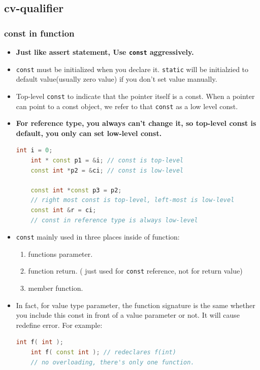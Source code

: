 \documentclass[a4paper,12pt,twoside]{book}
\begin{document}
\subsection{cv-qualifier}
\subsubsection{const in function}
\begin{itemize}
	\item \textbf{Just like assert statement, Use \texttt{const} aggressively.}
	
	\item \texttt{const} must be initialized when you declare it. \texttt{static} will be initialzied to default value(usually zero value) if you don't set value manually. 
	
	\item Top-level \texttt{const} to indicate that the pointer itself is a const. When a pointer can point to a const object, we refer to that \texttt{const} as a low level const.
	
	\item \textbf{For reference type, you always can't change it, so top-level const is default, you only can set low-level const.}
	\begin{lstlisting}[frame=single, language=c++]
	int i = 0;
	int * const p1 = &i; // const is top-level
	const int *p2 = &ci; // const is low-level
	
	const int *const p3 = p2;
	// right most const is top-level, left-most is low-level
	const int &r = ci;
	// const in reference type is always low-level
	\end{lstlisting}
	
	
	\item \texttt{const} mainly used in three places inside of function:
	\begin{enumerate}
		\item functions parameter.
		\item function return. ( just used for \texttt{const} reference, not for return value)
		\item member function.
	\end{enumerate}
	
	\item In fact, for value type parameter, the function signature is the same whether you include this const in front of a value parameter or not. It will cause redefine error. For example:
	\begin{lstlisting}[frame=single, language=c++]
	int f( int );
	int f( const int ); // redeclares f(int)
	// no overloading, there's only one function.
	\end{lstlisting}
	

\end{itemize}
\end{document}
